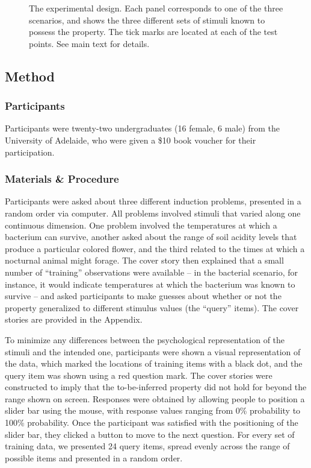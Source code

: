 \documentclass[doc]{apa6}
\begin{document}
\begin{figure*}[t]
\begin{center}
\hspace*{-1.2cm}
\caption{The experimental design. Each panel corresponds to one of the three scenarios, and shows the three different sets of stimuli known to possess the property. The tick marks are located at each of the test points. See main text for details.}
\label{design}
\end{center}
\end{figure*}

\subsection{Method}

\subsubsection{Participants} Participants were twenty-two undergraduates (16 female, 6 male) from the University of Adelaide, who were given a \$10 book voucher for their participation.

\subsubsection{Materials \& Procedure} Participants were asked about three different induction problems, presented in a random order via computer. All problems involved stimuli that varied along one continuous dimension. One problem involved the temperatures at which a bacterium can survive, another asked about the range of soil acidity levels that produce a particular colored flower, and the third related to the times at which a nocturnal animal might forage. The cover story then explained that a small number of ``training'' observations were available -- in the bacterial scenario, for instance, it would indicate temperatures at which the bacterium was known to survive -- and asked participants to make guesses about whether or not the property generalized to different stimulus values (the ``query'' items).  The cover stories are provided in the Appendix.

To minimize any differences between the psychological representation of the stimuli and the intended one, participants were shown a visual representation of the data, which marked the locations of training items with a black dot, and the query item was shown using a red question mark. The cover stories were constructed to imply that the to-be-inferred property did not hold for beyond the range shown on screen. Responses were obtained by allowing people to position a slider bar using the mouse, with response values ranging from 0\% probability to 100\% probability. Once the participant was satisfied with the positioning of the slider bar, they clicked a button to move to the next question. For every set of training data, we presented 24 query items, spread evenly across the range of possible items and presented in a random order.
\end{document}
